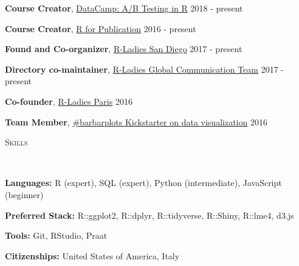 \documentclass[9pt]{article}
\newenvironment{changemargin}[2]{%
  \begin{list}{}{%
    \setlength{\topsep}{0pt}%
    \setlength{\leftmargin}{#1}%
    \setlength{\rightmargin}{#2}%
    \setlength{\listparindent}{\parindent}%
    \setlength{\itemindent}{\parindent}%
    \setlength{\parsep}{\parskip}%
  }%
  \item[]}{\end{list}
}
\newcommand{\lineover}{
	\begin{changemargin}{-0.05in}{-0.05in}
		\vspace*{-8pt}
		\hrulefill \\
		\vspace*{-2pt}
	\end{changemargin}
}
\newcommand{\header}[1]{
	\begin{changemargin}{-0.5in}{-0.5in}
		\scshape{#1}\\
  	\lineover
	\end{changemargin}
}
\newenvironment{body} {
	\vspace*{-16pt}
	\begin{changemargin}{-0.25in}{-0.5in}
  }	
	{\end{changemargin}
}
\begin{document}
\begin{body}
	\vspace{14pt}
	
	\textbf{Course Creator}, \href{https://www.datacamp.com/courses/ab-testing-in-r}{\color{red}DataCamp: A/B Testing in R} \hfill 2018 - present\\
	\medskip
	
	\textbf{Course Creator}, \href{https://pagepiccinini.com/r-course/}{\color{red}R for Publication} \hfill 2016 - present\\
	\medskip

	\textbf{Found and Co-organizer}, \href{https://www.meetup.com/rladies-san-diego/}{\color{red}R-Ladies San Diego} \hfill 2017 - present\\
	\medskip	

	\textbf{Directory co-maintainer}, \href{https://rladies.org/about-us/team/}{\color{red}R-Ladies Global Communication Team} \hfill 2017 - present\\
	\medskip

	\textbf{Co-founder}, \href{https://www.meetup.com/rladies-paris/}{\color{red}R-Ladies Paris} \hfill 2016\\
	\medskip

	\textbf{Team Member}, \href{https://barbarplots.github.io/}{\color{red}\#barbarplots Kickstarter on data visualization} \hfill 2016\\
	\medskip
		
\end{body}

\smallskip

\header{\color{red}Skills}

\begin{body}
	\vspace{14pt}
	
	\textbf{Languages:} R (expert), SQL (expert), Python (intermediate), JavaScript (beginner)\\
	\medskip

	\textbf{Preferred Stack:} R::ggplot2, R::dplyr, R::tidyverse, R::Shiny, R::lme4, d3.js\\
	\medskip
	
	\textbf{Tools:} Git, RStudio, Praat\\
	\medskip
	
	\textbf{Citizenships:} United States of America, Italy\\
	\medskip

\end{body}
\end{document}

